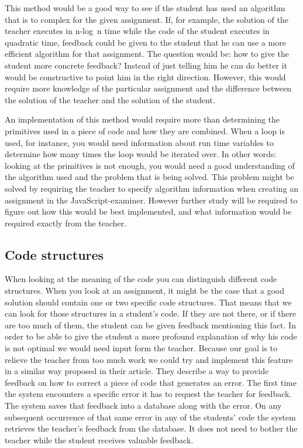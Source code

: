 \documentclass{article}
\begin{document}
This method would be a good way to see if the student has used an algorithm
that is to complex for the given assignment. If, for example, the solution of
the teacher executes in n-log~n time while the code of the student executes in
quadratic time, feedback could be given to the student that he can use a more
efficient algorithm for that assignment. The question would be: how to give the
student more concrete feedback? Instead of just telling him he can do better it
would be constructive to point him in the right direction. However, this would
require more knowledge of the particular assignment and the difference between
the solution of the teacher and the solution of the student.

An implementation of this method would require more than determining the
primitives used in a piece of code and how they are combined. When a loop is
used, for instance, you would need information about run time variables to
determine how many times the loop would be iterated over. In other words:
looking at the primitives is not enough, you would need a good understanding of
the algorithm used and the problem that is being solved. This problem might be
solved by requiring the teacher to specify algorithm information when creating
an assignment in the JavaScript-examiner. However further study will be
required to figure out how this would be best implemented, and what information
would be required exactly from the teacher.

\subsection{Code structures}

When looking at the meaning of the code you can distinguish different code
structures. When you look at an assignment, it might be the case that a good
solution should contain one or two specific code structures. That means that we
can look for those structures in a student's code. If they are not there, or if
there are too much of them, the student can be given feedback mentioning this
fact. In order to be able to give the student a more profound explanation of
why his code is not optimal we would need input form the teacher. Because our
goal is to relieve the teacher from too much work we could try and implement
this feature in a similar way \citet[Section 3.2]{watson2011learning} proposed
in their article. They describe a way to provide feedback on how to correct a
piece of code that generates an error. The first time the system encounters a
specific error it has to request the teacher for feedback. The system saves
that feedback into a database along with the error. On any subsequent
occurrence of that same error in any of the students' code the system retrieves
the teacher's feedback from the database. It does not need to bother the
teacher while the student receives valuable feedback.
\end{document}
